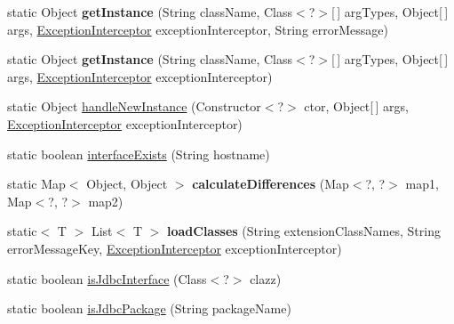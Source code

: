 \begin{DoxyCompactItemize}
static Object {\bfseries get\+Instance} (String class\+Name, Class$<$?$>$\mbox{[}$\,$\mbox{]} arg\+Types, Object\mbox{[}$\,$\mbox{]} args, \mbox{\hyperlink{interfacecom_1_1mysql_1_1cj_1_1exceptions_1_1_exception_interceptor}{Exception\+Interceptor}} exception\+Interceptor, String error\+Message)
\item 
\mbox{\label{classcom_1_1mysql_1_1cj_1_1util_1_1_util_a73976bd0506adf686764aa027e085bb3}} 
static Object {\bfseries get\+Instance} (String class\+Name, Class$<$?$>$\mbox{[}$\,$\mbox{]} arg\+Types, Object\mbox{[}$\,$\mbox{]} args, \mbox{\hyperlink{interfacecom_1_1mysql_1_1cj_1_1exceptions_1_1_exception_interceptor}{Exception\+Interceptor}} exception\+Interceptor)
\item 
static Object \mbox{\hyperlink{classcom_1_1mysql_1_1cj_1_1util_1_1_util_a6c3f08276e2a1f6721540f24e1996167}{handle\+New\+Instance}} (Constructor$<$?$>$ ctor, Object\mbox{[}$\,$\mbox{]} args, \mbox{\hyperlink{interfacecom_1_1mysql_1_1cj_1_1exceptions_1_1_exception_interceptor}{Exception\+Interceptor}} exception\+Interceptor)
\item 
static boolean \mbox{\hyperlink{classcom_1_1mysql_1_1cj_1_1util_1_1_util_a88747c641f2cab44ec8867dc38c3fa42}{interface\+Exists}} (String hostname)
\item 
\mbox{\label{classcom_1_1mysql_1_1cj_1_1util_1_1_util_a7ca2ca5ab2286628c8990a388ce6aa99}} 
static Map$<$ Object, Object $>$ {\bfseries calculate\+Differences} (Map$<$?, ?$>$ map1, Map$<$?, ?$>$ map2)
\item 
\mbox{\label{classcom_1_1mysql_1_1cj_1_1util_1_1_util_a1934cc15d2aae4985ce372a84e920eb7}} 
static$<$ T $>$ List$<$ T $>$ {\bfseries load\+Classes} (String extension\+Class\+Names, String error\+Message\+Key, \mbox{\hyperlink{interfacecom_1_1mysql_1_1cj_1_1exceptions_1_1_exception_interceptor}{Exception\+Interceptor}} exception\+Interceptor)
\item 
static boolean \mbox{\hyperlink{classcom_1_1mysql_1_1cj_1_1util_1_1_util_a6c781a9f788160ce358b6237b4a6b0da}{is\+Jdbc\+Interface}} (Class$<$?$>$ clazz)
\item 
static boolean \mbox{\hyperlink{classcom_1_1mysql_1_1cj_1_1util_1_1_util_a4ff66f7ccc05ec9631b13bb5e9e9fbbe}{is\+Jdbc\+Package}} (String package\+Name)
\item 

\end{DoxyCompactItemize}
